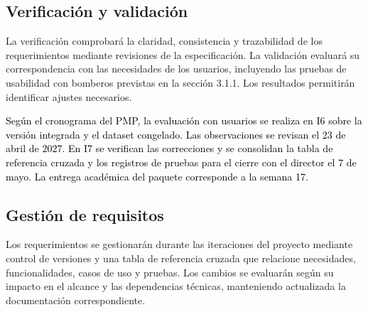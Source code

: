 \subsection{Verificación y validación}
\label{sec:srs-4-4}

La verificación comprobará la claridad, consistencia y trazabilidad de los requerimientos mediante revisiones de la especificación. La validación evaluará su correspondencia con las necesidades de los usuarios, incluyendo las pruebas de usabilidad con bomberos previstas en la sección 3.1.1. Los resultados permitirán identificar ajustes necesarios.

\textcolor{black}{Según el cronograma del PMP, la evaluación con usuarios se realiza en I6 sobre la versión integrada y \textcolor{black}{el dataset congelado}. Las observaciones se revisan el 23 de abril de 2027. En I7 se verifican las correcciones y se consolidan la tabla de referencia cruzada y los registros de pruebas para el cierre con el director el 7 de mayo. La entrega académica del paquete corresponde a la semana 17.}

\subsection{Gestión de requisitos}
\label{sec:srs-4-5}

Los requerimientos se gestionarán durante las iteraciones del proyecto mediante control de versiones y una tabla de referencia cruzada que relacione necesidades, funcionalidades, casos de uso y pruebas. Los cambios se evaluarán según su impacto en el alcance y las dependencias técnicas, manteniendo actualizada la documentación correspondiente.
